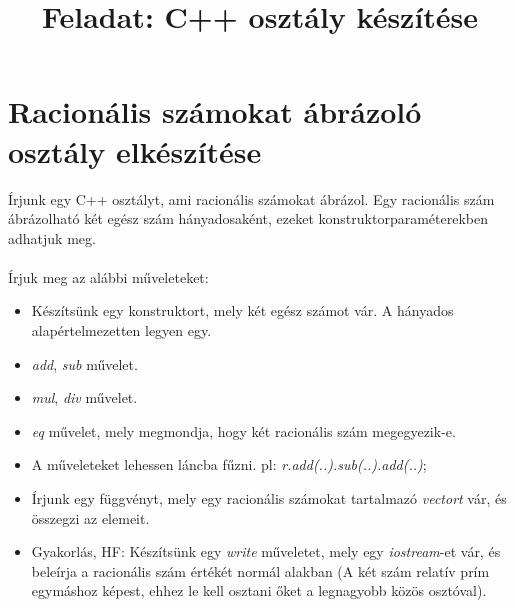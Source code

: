 \documentclass[12pt,a4paper]{article}
\title{Feladat: C++ osztály készítése}
\begin{document}
\section{Racionális számokat ábrázoló osztály elkészítése}

Írjunk egy C++ osztályt, ami racionális számokat ábrázol. Egy racionális szám ábrázolható két egész szám hányadosaként, ezeket konstruktorparaméterekben adhatjuk meg. \\ \\
Írjuk meg az alábbi műveleteket:
\begin{itemize}
\item Készítsünk egy konstruktort, mely két egész számot vár. A hányados alapértelmezetten legyen egy.
\item \textit{add}, \textit{sub} művelet.
\item \textit{mul}, \textit{div} művelet.
\item \textit{eq} művelet, mely megmondja, hogy két racionális szám megegyezik-e.
\item A műveleteket lehessen láncba fűzni. pl: \textit{r.add(..).sub(..).add(..)};
\item Írjunk egy függvényt, mely egy racionális számokat tartalmazó \textit{vectort} vár, és összegzi az elemeit. 
\item Gyakorlás, HF: Készítsünk egy \textit{write} műveletet, mely egy \textit{iostream}-et vár, és beleírja a racionális szám értékét normál alakban (A két szám relatív prím egymáshoz képest, ehhez le kell osztani őket a legnagyobb közös osztóval).
\end{itemize}
\end{document}
